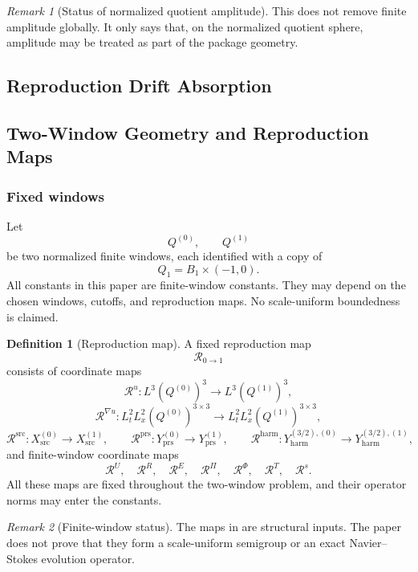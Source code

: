 \documentclass[11pt]{article}
\numberwithin{equation}{section}
\theoremstyle{definition}
\newtheorem{definition}[definition]{Definition}
\theoremstyle{remark}
\newtheorem{remark}[remark]{Remark}
\newcommand{\prs}{\mathrm{prs}}
\newcommand{\harm}{\mathrm{harm}}
\newcommand{\src}{\mathrm{src}}
\newcommand{\calR}{\mathcal R}
\newcommand{\Xsrc}{X_{\src}}
\newcommand{\Yprs}{Y_{\prs}}
\newcommand{\Qone}{Q_1}
\begin{document}
\begin{remark}[Status of normalized quotient amplitude]
This does not remove finite amplitude globally.  It only says that, on the
normalized quotient sphere, amplitude may be treated as part of the package
geometry.
\end{remark}

\subsection*{Reproduction Drift Absorption}
\subsection{Two-Window Geometry and Reproduction Maps}
\label{rep:sec:two-window-geometry}

\subsubsection{Fixed windows}

Let
\[
    Q^{(0)},\qquad Q^{(1)}
\]
be two normalized finite windows, each identified with a copy of
\[
    \Qone=B_1\times(-1,0).
\]
All constants in this paper are finite-window constants.  They may depend
on the chosen windows, cutoffs, and reproduction maps.  No scale-uniform
boundedness is claimed.

\begin{definition}[Reproduction map]
\label{rep:def:reproduction-map}
A fixed reproduction map
\[
    \calR_{0\to1}
\]
consists of coordinate maps
\[
    \calR^u:L^3(Q^{(0)})^3\to L^3(Q^{(1)})^3,
\]
\[
    \calR^{\nabla u}:
    L^2_tL^2_x(Q^{(0)})^{3\times3}
    \to
    L^2_tL^2_x(Q^{(1)})^{3\times3},
\]
\[
    \calR^{\src}:\Xsrc^{(0)}\to\Xsrc^{(1)},
    \qquad
    \calR^{\prs}:\Yprs^{(0)}\to\Yprs^{(1)},
    \qquad
    \calR^{\harm}:Y_{\harm}^{(3/2),(0)}\to Y_{\harm}^{(3/2),(1)},
\]
and finite-window coordinate maps
\[
    \calR^U,\quad
    \calR^R,\quad
    \calR^E,\quad
    \calR^\Pi,\quad
    \calR^\Phi,\quad
    \calR^T,\quad
    \calR^s.
\]
All these maps are fixed throughout the two-window problem, and their operator
norms may enter the constants.
\end{definition}

\begin{remark}[Finite-window status]
The maps in  are structural inputs.  The paper
does not prove that they form a scale-uniform semigroup or an exact
Navier--Stokes evolution operator.
\end{remark}
\end{document}
